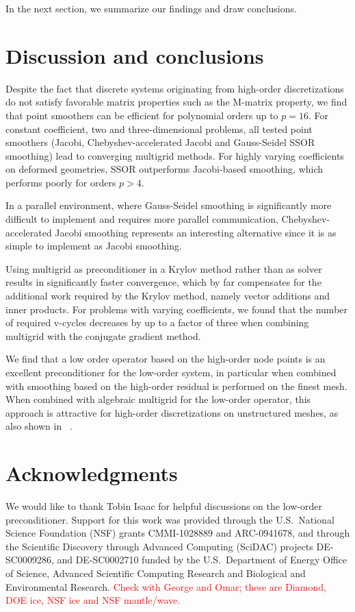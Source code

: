 \documentclass[smallcondensed,final]{svjour3}     %
\newcommand{\todo}[1]{\textcolor{red}{ #1}}
\begin{document}
In the next section, we summarize our findings and draw conclusions.

\section{Discussion and conclusions}
\label{sec:discuss}

Despite the fact that discrete systems originating from high-order
discretizations do not satisfy favorable matrix properties such as the
M-matrix property, we find that point smoothers can be efficient for
polynomial orders up to $p=16$.  For constant coefficient, two and
three-dimensional problems, all tested point smoothers (Jacobi,
Chebyshev-accelerated Jacobi and Gauss-Seidel SSOR smoothing) lead to
converging multigrid methods. For highly varying coefficients on
deformed geometries, SSOR outperforms Jacobi-based smoothing, which
performs poorly for orders $p>4$.

In a parallel environment, where Gauss-Seidel smoothing is
significantly more difficult to implement and requires more parallel
communication, Chebyshev-accelerated Jacobi smoothing represents an
interesting alternative since it is as simple to implement as Jacobi
smoothing.

Using multigrid as preconditioner in a Krylov method rather than as
solver results in significantly faster convergence, which by far
compensates for the additional work required by the Krylov method,
namely vector additions and inner products.  For problems with varying
coefficients, we found that the number of required v-cycles decreases
by up to a factor of three when combining multigrid with the conjugate
gradient method.

We find that a low order operator based on the high-order node points
is an excellent preconditioner for the low-order system, in particular
when combined with smoothing based on the high-order residual is
performed on the finest mesh.  When combined with algebraic multigrid
for the low-order operator, this approach is attractive for high-order
discretizations on unstructured meshes, as also shown in
~\cite{Brown10, DevilleMund90, HeysManteuffelMcCormickEtAl05}.



\section*{Acknowledgments}
We would like to thank Tobin Isaac for helpful discussions on the
low-order preconditioner. Support for this work was
  provided through the U.S.~National Science Foundation (NSF) grants
  CMMI-1028889 and   %
  ARC-0941678,       %
 and through the Scientific Discovery through Advanced
  Computing (SciDAC) projects 
  DE-SC0009286,   %
  and DE-SC0002710 %
  funded by the U.S.~Department of Energy
  Office of Science, Advanced Scientific Computing Research and
  Biological and Environmental Research.
 \todo{Check with George and Omar; these are Diamond, DOE ice, NSF ice and NSF mantle/wave.}




\end{document}
